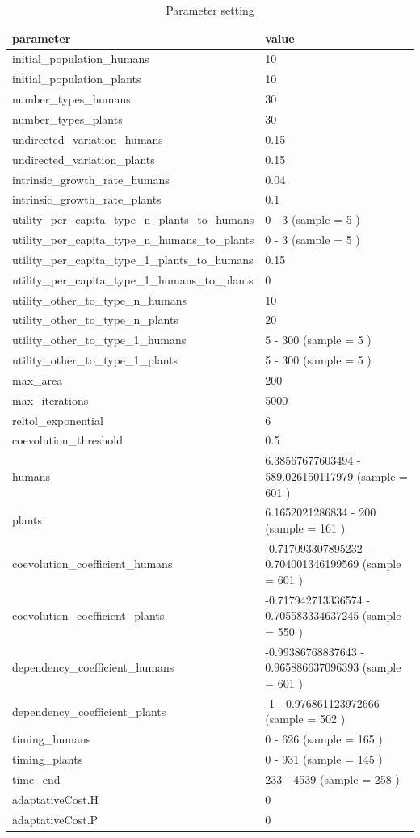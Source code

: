 \documentclass[
]{book}
\begin{document}
\begin{table}[!h]

\caption{\label{tab:4Ub1mUntablepdf}Parameter setting}
\centering
\begin{tabular}[t]{l|l}
\hline
parameter & value\\
\hline
initial\_population\_humans & 10\\
\hline
initial\_population\_plants & 10\\
\hline
number\_types\_humans & 30\\
\hline
number\_types\_plants & 30\\
\hline
undirected\_variation\_humans & 0.15\\
\hline
undirected\_variation\_plants & 0.15\\
\hline
intrinsic\_growth\_rate\_humans & 0.04\\
\hline
intrinsic\_growth\_rate\_plants & 0.1\\
\hline
utility\_per\_capita\_type\_n\_plants\_to\_humans & 0 - 3 (sample = 5 )\\
\hline
utility\_per\_capita\_type\_n\_humans\_to\_plants & 0 - 3 (sample = 5 )\\
\hline
utility\_per\_capita\_type\_1\_plants\_to\_humans & 0.15\\
\hline
utility\_per\_capita\_type\_1\_humans\_to\_plants & 0\\
\hline
utility\_other\_to\_type\_n\_humans & 10\\
\hline
utility\_other\_to\_type\_n\_plants & 20\\
\hline
utility\_other\_to\_type\_1\_humans & 5 - 300 (sample = 5 )\\
\hline
utility\_other\_to\_type\_1\_plants & 5 - 300 (sample = 5 )\\
\hline
max\_area & 200\\
\hline
max\_iterations & 5000\\
\hline
reltol\_exponential & 6\\
\hline
coevolution\_threshold & 0.5\\
\hline
humans & 6.38567677603494 - 589.026150117979 (sample = 601 )\\
\hline
plants & 6.1652021286834 - 200 (sample = 161 )\\
\hline
coevolution\_coefficient\_humans & -0.717093307895232 - 0.704001346199569 (sample = 601 )\\
\hline
coevolution\_coefficient\_plants & -0.717942713336574 - 0.705583334637245 (sample = 550 )\\
\hline
dependency\_coefficient\_humans & -0.99386768837643 - 0.965886637096393 (sample = 601 )\\
\hline
dependency\_coefficient\_plants & -1 - 0.976861123972666 (sample = 502 )\\
\hline
timing\_humans & 0 - 626 (sample = 165 )\\
\hline
timing\_plants & 0 - 931 (sample = 145 )\\
\hline
time\_end & 233 - 4539 (sample = 258 )\\
\hline
adaptativeCost.H & 0\\
\hline
adaptativeCost.P & 0\\
\hline
\end{tabular}
\end{table}
\end{document}
